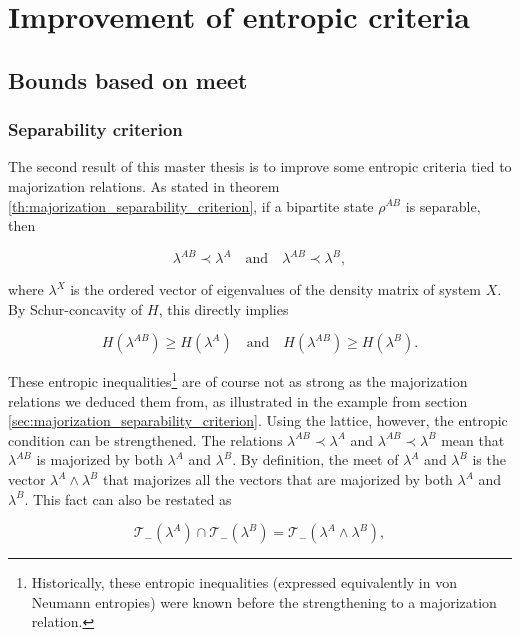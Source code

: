 \chapter{Improvement of entropic criteria} \label{chap:criteria}

\section{Bounds based on meet}

\subsection{Separability criterion}

The second result of this master thesis is to improve some entropic criteria tied to majorization relations. As stated in theorem \ref{th:majorization_separability_criterion}, if a bipartite state $\rho^{AB}$ is separable, then

\begin{equation}
    \lambda^{AB} \prec \lambda^A \quad \text{and} \quad \lambda^{AB} \prec \lambda^{B},
\end{equation}

where $\lambda^X$ is the ordered vector of eigenvalues of the density matrix of system $X$. By Schur-concavity of $H$, this directly implies

\begin{equation}
    H(\lambda^{AB}) \geq H(\lambda^A) \quad \text{and} \quad H(\lambda^{AB}) \geq H(\lambda^B).
\end{equation}

These entropic inequalities\footnote{Historically, these entropic inequalities (expressed equivalently in von Neumann entropies) were known before the strengthening to a majorization relation.} are of course not as strong as the majorization relations we deduced them from, as illustrated in the example from section \ref{sec:majorization_separability_criterion}. Using the lattice, however, the entropic condition can be strengthened. The relations $\lambda^{AB} \prec \lambda^A$ and $\lambda^{AB} \prec \lambda^{B}$ mean that $\lambda^{AB}$ is majorized by both $\lambda^A$ and $\lambda^B$. By definition, the meet of $\lambda^A$ and $\lambda^B$ is the vector $\lambda^A \wedge \lambda^B$ that majorizes all the vectors that are majorized by both $\lambda^A$ and $\lambda^B$. This fact can also be restated as 

\begin{equation}
    \mathcal{T}_-(\lambda^A) \cap \mathcal{T}_-(\lambda^B) = \mathcal{T}_-(\lambda^A \wedge \lambda^B),
\end{equation}

